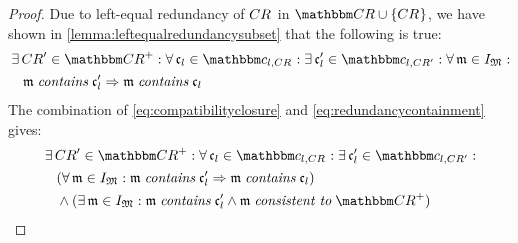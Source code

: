 \begin{proof}
    Due to left-equal redundancy of $\consistencyrelation{CR}{}$ in $\consistencyrelationset{CR} \cup \setted{\consistencyrelation{CR}{}}$, we have shown in \autoref{lemma:leftequalredundancysubset} that the following is true:
    \begin{align} \label{eq:redundancycontainment}
        & \nonumber 
        \exists \consistencyrelation{CR}{}' \in \transitiveclosure{\consistencyrelationset{CR}} : \forall \conditionelement{c}{l} \in \condition{c}{l, \consistencyrelation{CR}{}} : \exists \conditionelement{c}{l}' \in \condition{c}{l,\consistencyrelation{CR}{}'} : \forall \modeltuple{m} \in \metamodeltupleinstanceset{M} : \\
        & \formulaskip
        \modeltuple{m} \containsmath \conditionelement{c}{l}' \Rightarrow \modeltuple{m} \containsmath \conditionelement{c}{l}
    \end{align}
    The combination of \autoref{eq:compatibilityclosure} and \autoref{eq:redundancycontainment} gives:
    \begin{align*}
        & \nonumber 
        \exists \consistencyrelation{CR}{}' \in \transitiveclosure{\consistencyrelationset{CR}} : \forall \conditionelement{c}{l} \in \condition{c}{l, \consistencyrelation{CR}{}} : \exists \conditionelement{c}{l}' \in \condition{c}{l,\consistencyrelation{CR}{}'} : \\
        & \formulaskip
        (\forall \modeltuple{m} \in \metamodeltupleinstanceset{M} : \modeltuple{m} \containsmath \conditionelement{c}{l}' \Rightarrow \modeltuple{m} \containsmath \conditionelement{c}{l}) \\
        & \formulaskip
        \land (\exists \modeltuple{m} \in \metamodeltupleinstanceset{M} :
        \modeltuple{m} \containsmath \conditionelement{c}{l}' \land \modeltuple{m} \consistenttomath \transitiveclosure{\consistencyrelationset{CR}})
    \end{align*}

\end{proof}
